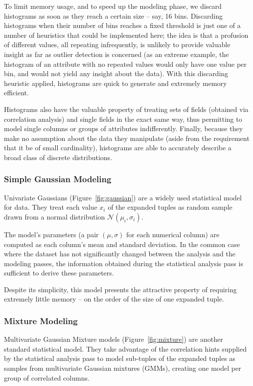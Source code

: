 To limit memory usage, and to speed up the modeling phase, we discard histograms as soon as they reach a certain size -- say, 16 bins. Discarding histograms when their number of bins reaches a fixed threshold is just one of a number of heuristics that could be implemented here; the idea is that a profusion of different values, all repeating infrequently, is unlikely to provide valuable insight as far as outlier detection is concerned (as an extreme example, the histogram of an attribute with no repeated values would only have one value per bin, and would not yield any insight about the data). With this discarding heuristic applied, histograms are quick to generate and extremely memory efficient.

Histograms also have the valuable property of treating sets of fields (obtained via correlation analysis) and single fields in the exact same way, thus permitting to model single columns or groups of attributes indifferently. Finally, because they make no assumption about the data they manipulate (aside from the requirement that it be of small cardinality), histograms are able to accurately describe a broad class of discrete distributions.


\subsubsection{Simple Gaussian Modeling}
\label{sec:gaus_model}
Univariate Gaussians (Figure~\ref{fig:gaussian}) are a widely used statistical model for data. They treat each value $x_i$ of the expanded tuples as random sample drawn from a normal distribution $\mathcal N(\mu_i, \sigma_i)$.

The model's parameters (a pair $(\mu, \sigma)$ for each numerical column) are computed as each column's mean and standard deviation. In the common case where the dataset has not significantly changed between the analysis and the modeling passes, the information obtained during the statistical analysis pass is sufficient to derive these parameters.

Despite its simplicity, this model presents the attractive property of requiring extremely little memory -- on the order of the size of one expanded tuple.


\subsubsection{Mixture Modeling}
\label{sec:mixture_model}
Multivariate Gaussian Mixture models (Figure~\ref{fig:mixture}) are another standard statistical model.  They take advantage of the correlation hints supplied by the statistical analysis pass to model sub-tuples of the expanded tuples as samples from multivariate Gaussian mixtures (GMMs), creating one model per group of correlated columns.


